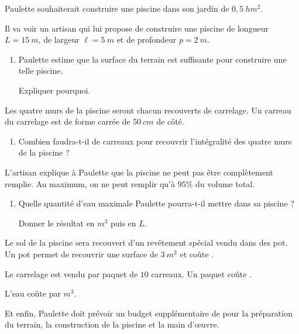 \documentclass[12pt,french]{article}
\begin{document}
\begin{center}
\end{center}\bigskip

    Paulette souhaiterait construire une piscine dans son jardin de $0,5~hm^2$.\par
    Il va voir un artisan qui lui propose de construire une piscine de longueur $L = 15~m$, de largeur $\ell = 5~m$ et de profondeur $p = 2~m$.

    \begin{enumerate}
        \item Paulette estime que la surface du terrain est suffisante pour construire une telle piscine.\par Expliquer pourquoi.
    \end{enumerate}

    Les quatre murs de la piscine seront chacun recouverts de carrelage. Un carreau du carrelage est de forme carrée de $50~cm$ de côté.

    \begin{enumerate}[resume]
        \item Combien faudra-t-il de carreaux pour recouvrir l'intégralité des quatre murs de la piscine ?
    \end{enumerate}

    L'artisan explique à Paulette que la piscine ne peut pas être complètement remplie. Au maximum, on ne peut remplir qu'à $95\%$ du volume total.

    \begin{enumerate}[resume]
        \item Quelle quantité d'eau maximale Paulette pourra-t-il mettre dans sa piscine ? \par Donner le résultat en $m^3$ puis en $L$.
    \end{enumerate}

    Le sol de la piscine sera recouvert d'un revêtement spécial vendu dans des pot. Un pot permet de recouvrir une surface de $3~m^2$ et coûte .\par
    Le carrelage est vendu par paquet de $10$ carreaux. Un paquet coûte .\par
    L'eau coûte  par $m^3$.\par
    Et enfin, Paulette doit prévoir un budget supplémentaire de  pour la préparation du terrain, la construction de la piscine et la main d'{\oe}uvre.
\end{document}
